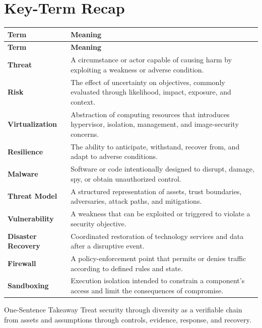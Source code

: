\documentclass[11pt,letterpaper]{article}
\begin{document}
\section*{Key-Term Recap}
\begin{longtable}{>{\raggedright\arraybackslash}p{}>{\raggedright\arraybackslash}p{}}
\toprule\rowcolor{Navy}\color{white}\textbf{Term} & \color{white}\textbf{Meaning}\\\midrule
\endfirsthead
\toprule\rowcolor{Navy}\color{white}\textbf{Term} & \color{white}\textbf{Meaning}\\\midrule
\endhead
\textbf{Threat} & A circumstance or actor capable of causing harm by exploiting a weakness or adverse condition. \\\midrule
\textbf{Risk} & The effect of uncertainty on objectives, commonly evaluated through likelihood, impact, exposure, and context. \\\midrule
\textbf{Virtualization} & Abstraction of computing resources that introduces hypervisor, isolation, management, and image-security concerns. \\\midrule
\textbf{Resilience} & The ability to anticipate, withstand, recover from, and adapt to adverse conditions. \\\midrule
\textbf{Malware} & Software or code intentionally designed to disrupt, damage, spy, or obtain unauthorized control. \\\midrule
\textbf{Threat Model} & A structured representation of assets, trust boundaries, adversaries, attack paths, and mitigations. \\\midrule
\textbf{Vulnerability} & A weakness that can be exploited or triggered to violate a security objective. \\\midrule
\textbf{Disaster Recovery} & Coordinated restoration of technology services and data after a disruptive event. \\\midrule
\textbf{Firewall} & A policy-enforcement point that permits or denies traffic according to defined rules and state. \\\midrule
\textbf{Sandboxing} & Execution isolation intended to constrain a component's access and limit the consequences of compromise. \\\midrule
\bottomrule
\end{longtable}
\begin{CornellExamBox}{One-Sentence Takeaway}
Treat security through diversity as a verifiable chain from assets and assumptions through controls, evidence, response, and recovery.
\end{CornellExamBox}
\end{document}
